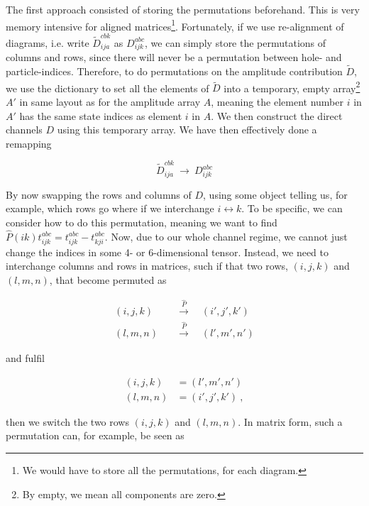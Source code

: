 \documentclass[10pt,twoside]{report}
\begin{document}
	The first approach consisted of storing the permutations beforehand. This is very memory intensive for aligned matrices\footnote{We would have to store all the permutations, for each diagram.}. Fortunately, if we use re-alignment of diagrams, i.e. write $\tilde{D}_{ija}^{cbk}$ as $D_{ijk}^{abc}$, we can simply store the permutations of columns and rows, since there will never be a permutation between hole- and particle-indices. Therefore, to do permutations on the amplitude contribution $\tilde{D}$, we use the dictionary to set all the elements of $\tilde{D}$ into a temporary, empty array\footnote{By empty, we mean all components are zero.} $A'$ in same layout as for the amplitude array $A$, meaning the element number $i$ in $A'$ has the same state indices as element $i$ in $A$. We then construct the direct channels $D$ using this temporary array. We have then effectively done a remapping
	
	\begin{equation}
		\tilde{D}_{ija}^{cbk} \:\rightarrow\: D_{ijk}^{abc}
	\end{equation}
	
	By now swapping the rows and columns of $D$, using some object telling us, for example, which rows go where if we interchange $i\leftrightarrow k$. To be specific, we can consider how to do this permutation, meaning we want to find $\hat{P}(ik)t_{ijk}^{abc} = t_{ijk}^{abc} - t_{kji}^{abc}$. Now, due to our whole channel regime, we cannot just change the indices in some 4- or 6-dimensional tensor. Instead, we need to interchange columns and rows in matrices, such if that two rows, $(i,j,k)$ and $(l,m,n)$, that become permuted as
	
	\begin{align}
	(i,j,k) \quad&\overset{\hat{P}}{\longrightarrow}\quad (i',j',k') \\
	(l,m,n) \quad&\overset{\hat{P}}{\longrightarrow}\quad (l',m',n')
	\end{align}
	
	and fulfil
	
	\begin{align}
	(i,j,k) &= (l',m',n') \\
	(l,m,n) &= (i',j',k') \:,
	\end{align}
	
	then we switch the two rows $(i,j,k)$ and $(l,m,n)$. In matrix form, such a permutation can, for example, be seen as
	
\end{document}
